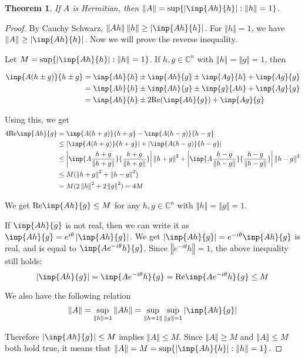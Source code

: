 \documentclass[twofold]{article}
\newcommand*\norm[1]{\left \Vert #1 \right\Vert}
\newcommand*\abs[1]{\left \vert #1 \right\vert}
\theoremstyle{plain}
\newtheorem{theorem}{Theorem}
\theoremstyle{definition}
\theoremstyle{remark}
\begin{document}
\begin{theorem}\label{norm_herm} If \(A\) is Hermitian, then \(\norm{A} = \sup\{\abs{\inp{Ah}{h}} : \norm{h} = 1\}\).\end{theorem}
\begin{proof} By Cauchy Schwarz, \(\norm{Ah}\norm{h} \ge \abs{\inp{Ah}{h}}\). For \(\norm{h} =1\), we have  \(\norm{A} \ge \abs{\inp{Ah}{h}}\). Now we will prove the reverse inequality. 

Let \(M = \sup \{\abs{\inp{Ah}{h}} : \norm{h} = 1 \}\). If \(h, g \in \mathbb{C}^n\) with \(\norm{h} = \norm{g} = 1\), then

\begin{equation*} \begin{split}
\inp{A (h \pm g)}{h\pm g} & = \inp{Ah}{h} \pm \inp{Ah}{g} \pm \inp{Ag}{h} + \inp{Ag}{g} \\
& = \inp{Ah}{h} \pm \inp{Ah}{g} \pm \inp{g}{Ah} + \inp{Ag}{g} \\
& = \inp{Ah}{h} \pm 2 \text{Re}(\inp{Ah}{g}) + \inp{Ag}{g} \\
\end{split} \end{equation*}

Using this, we get 
\begin{equation*} \begin{split}
4\mathrm{Re} \inp{Ah}{g} &= \inp{A(h+g)}{h+g} - \inp{A(h-g)}{h-g} \\
& \le \abs{\inp{A(h+g)}{h+g}} + \abs{\inp{A(h-g)}{h-g}} \\
& \le \abs{\inp{A \frac{h+g}{\norm{h+g}}}{\frac{h+g}{\norm{h+g}}}} \norm{h + g}^2 + \abs{\inp{A \frac{h-g}{\norm{h-g}}}{\frac{h-g}{\norm{h-g}}}} \norm{h - g}^2\\
& \le M (\norm{h + g}^2 + \norm{h-g}^2) \\
& = M (2 \norm{h}^2 + 2 \norm{g}^2) = 4M 
\end{split} \end{equation*}


We get \(\text{Re} \inp{Ah}{g} \le M\) for any \(h, g \in \mathbb{C}^n\) with \(\norm{h} = \norm{g} = 1\). 

If \(\inp{Ah}{g}\) is not real, then we can write it as  \(\inp{Ah}{g} = e^{i \theta} \abs{\inp{Ah}{g}}\). We get \(\abs{\inp{Ah}{g}} = e^{-i \theta} \inp{Ah}{g}\) is real, and is equal to \(\inp{A e^{- i\theta}h}{g}\). Since \(\norm{e^{-i\theta} h}= 1\), the above inequality still holds:
 \[\abs{\inp{Ah}{g}} = \inp{Ae^{-i\theta}h}{g} =  \text{Re} \inp{Ae^{-i\theta}h}{g} \le M\]

We also have the following relation
 \[\norm{A} = \sup_{\norm{h} =1} \norm{Ah} = \sup_{\norm{h = 1}} \sup_{\norm{g} = 1} \abs{\inp{Ah}{g}} \]

Therefore \(\abs{\inp{Ah}{g}} \le M\)  implies \(\norm{A} \le M\). Since \(\norm{A} \ge M\) and \(\norm{A} \le M\) both hold true, it means that \(\norm{A} = M = \sup \{ \abs{\inp{Ah}{h}} : \norm{h} = 1 \}\).
\end{proof}
\end{document}
